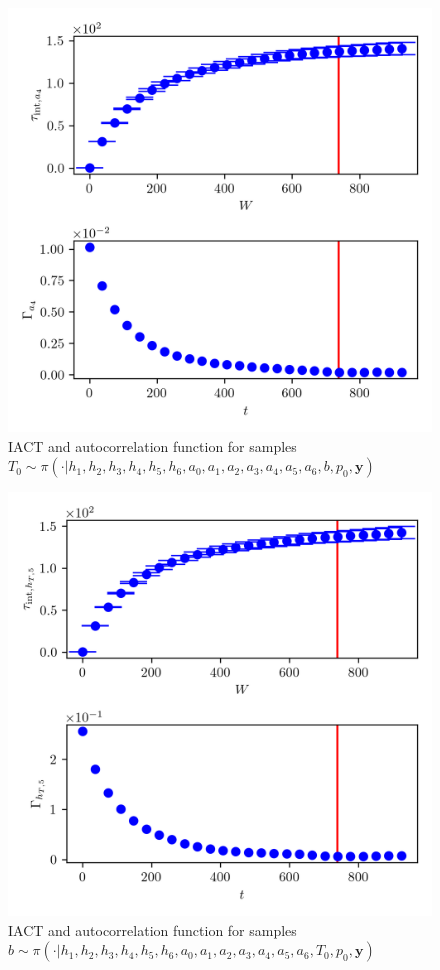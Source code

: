 \begin{figure}[ht!]
	\centering
	\includegraphics{UwerrTauIntTWalk13.png}
	\caption[IACT and autocorrelation function for $T_0$ samples.]{IACT and autocorrelation function for samples $T_0 \sim \pi( \cdot | h_1, h_2,h_3,h_4,h_5,h_6,a_0,a_1,a_2,a_3,a_4,a_5,a_6,b,p_0,  \bm{y})$}
	\label{fig:}
\end{figure}
\begin{figure}[ht!]
	\centering
	\includegraphics{UwerrTauIntTWalk14.png}
	\caption[IACT and autocorrelation function for $b$ samples.]{IACT and autocorrelation function for samples $b \sim \pi( \cdot | h_1, h_2,h_3,h_4,h_5,h_6,a_0,a_1,a_2,a_3,a_4,a_5,a_6,T_0,p_0,  \bm{y})$}
	\label{fig:}
\end{figure}

